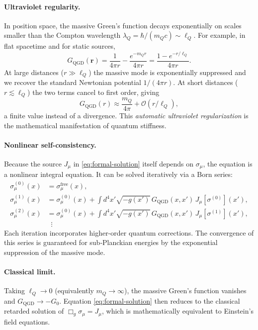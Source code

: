 \documentclass[11pt,a4paper]{article}
\theoremstyle{definition}
\theoremstyle{remark}
\begin{document}
	\paragraph{Ultraviolet regularity.} In position space, the massive Green's function decays exponentially on scales smaller than the Compton wavelength $\lambda_Q = \hbar/(m_Q c) \sim \ell_Q$. For example, in flat spacetime and for static sources,
	\begin{equation}
		G_{\text{QGD}}(\mathbf{r}) = \frac{1}{4\pi r} - \frac{e^{-m_Q r}}{4\pi r} 
		= \frac{1 - e^{-r/\ell_Q}}{4\pi r}.
		\label{eq:green-static}
	\end{equation}
	At large distances ($r \gg \ell_Q$) the massive mode is exponentially suppressed and we recover the standard Newtonian potential $1/(4\pi r)$. At short distances ($r \lesssim \ell_Q$) the two terms cancel to first order, giving
	\begin{equation}
		G_{\text{QGD}}(r) \approx \frac{m_Q}{4\pi} + \mathcal{O}(r/\ell_Q),
	\end{equation}
	a finite value instead of a divergence. This \emph{automatic ultraviolet regularization} is the mathematical manifestation of quantum stiffness.
	
	\paragraph{Nonlinear self-consistency.} Because the source $J_\mu$ in \eqref{eq:formal-solution} itself depends on $\sigma_\mu$, the equation is a nonlinear integral equation. It can be solved iteratively via a Born series:
	\begin{align}
		\sigma_\mu^{(0)}(x) &= \sigma_\mu^{\text{free}}(x), \nonumber\\
		\sigma_\mu^{(1)}(x) &= \sigma_\mu^{(0)}(x) + \int d^4x' \sqrt{-g(x')} \, G_{\text{QGD}}(x,x') \, J_\mu[\sigma^{(0)}](x'), \nonumber\\
		\sigma_\mu^{(2)}(x) &= \sigma_\mu^{(0)}(x) + \int d^4x' \sqrt{-g(x')} \, G_{\text{QGD}}(x,x') \, J_\mu[\sigma^{(1)}](x'), \nonumber\\
		&\;\;\vdots
	\end{align}
	Each iteration incorporates higher-order quantum corrections. The convergence of this series is guaranteed for sub‑Planckian energies by the exponential suppression of the massive mode.
	
	\paragraph{Classical limit.} Taking $\ell_Q \to 0$ (equivalently $m_Q \to \infty$), the massive Green's function vanishes and $G_{\text{QGD}} \to -G_0$. Equation \eqref{eq:formal-solution} then reduces to the classical retarded solution of $\Box_g \sigma_\mu = J_\mu$, which is mathematically equivalent to Einstein's field equations.
	
\end{document}
